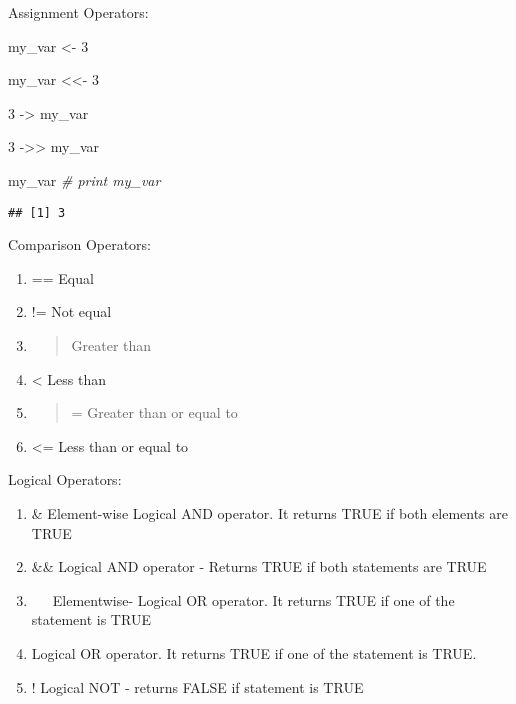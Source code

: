 \documentclass[
]{article}
\newenvironment{Shaded}{\begin{snugshade}}{\end{snugshade}}
\newcommand{\CommentTok}[1]{\textcolor[rgb]{0.56,0.35,0.01}{\textit{#1}}}
\newcommand{\DecValTok}[1]{\textcolor[rgb]{0.00,0.00,0.81}{#1}}
\newcommand{\NormalTok}[1]{#1}
\newcommand{\OtherTok}[1]{\textcolor[rgb]{0.56,0.35,0.01}{#1}}
\begin{document}
Assignment Operators:

\begin{Shaded}
\begin{Highlighting}[]
\NormalTok{my\_var }\OtherTok{\textless{}{-}} \DecValTok{3}

\NormalTok{my\_var }\OtherTok{\textless{}\textless{}{-}} \DecValTok{3}

\DecValTok{3} \OtherTok{{-}\textgreater{}}\NormalTok{ my\_var}

\DecValTok{3} \OtherTok{{-}\textgreater{}\textgreater{}}\NormalTok{ my\_var}

\NormalTok{my\_var }\CommentTok{\# print my\_var}
\end{Highlighting}
\end{Shaded}

\begin{verbatim}
## [1] 3
\end{verbatim}

Comparison Operators:

\begin{enumerate}
\def\labelenumi{\arabic{enumi}.}
\item
  == Equal\\
\item
  != Not equal\\
\item
  \begin{quote}
  Greater than
  \end{quote}
\item
  \textless{} Less than\\
\item
  \begin{quote}
  = Greater than or equal to
  \end{quote}
\item
  \textless= Less than or equal to
\end{enumerate}

Logical Operators:

\begin{enumerate}
\def\labelenumi{\arabic{enumi}.}
\item
  \& Element-wise Logical AND operator. It returns TRUE if both elements
  are TRUE
\item
  \&\& Logical AND operator - Returns TRUE if both statements are TRUE
\item
  ~~~Elementwise- Logical OR operator. It returns TRUE if one of the
  statement is TRUE
\item
  \textbar\textbar{} Logical OR operator. It returns TRUE if one of the
  statement is TRUE.
\item
  ! Logical NOT - returns FALSE if statement is TRUE
\end{enumerate}
\end{document}
